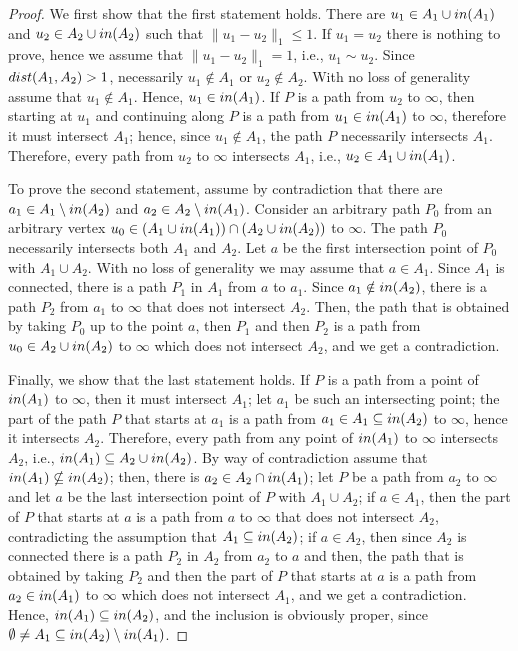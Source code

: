 \documentclass[11pt, reqno]{amsart}
\numberwithin{equation}{section}
\begin{document}
\begin{proof}
We first show that the first statement holds. 
There are $u_1\in A_1\cup{\rm in}(A_1)$ and $u_2\in A_2\cup{\rm in}(A_2)$ such that $\lVert u_1-u_2\rVert_1\leq 1$.
If $u_1=u_2$ there is nothing to prove, hence we assume that $\lVert u_1-u_2\rVert_1=1$, i.e., $u_1\sim u_2$.
Since ${\rm dist}(A_1,A_2)>1$, necessarily $u_1\notin A_1$ or $u_2\notin A_2$.
With no loss of generality assume that $u_1\notin A_1$.
Hence, $u_1\in{\rm in}(A_1)$.
If $P$ is a path from $u_2$ to $\infty$, then starting at $u_1$ and continuing along $P$ is a path from $u_1\in{\rm in}(A_1)$ to $\infty$, therefore it must intersect $A_1$; hence, since $u_1\notin A_1$, the path $P$ necessarily intersects $A_1$.
Therefore, every path from $u_2$ to $\infty$ intersects $A_1$, i.e., $u_2\in A_1\cup{\rm in}(A_1)$.

To prove the second statement, assume by contradiction that there are $a_1\in A_1\setminus{\rm in}(A_2)$ and $a_2\in A_2\setminus{\rm in}(A_1)$.
Consider an arbitrary path $P_0$ from an arbitrary vertex $u_0\in(A_1\cup{\rm in}(A_1))\cap(A_2\cup{\rm in}(A_2))$ to $\infty$. 
The path $P_0$ necessarily intersects both $A_1$ and $A_2$. Let $a$ be the first intersection point of $P_0$ with $A_1
\cup A_2$. With no loss of generality we may assume that $a\in A_1$. 
Since $A_1$ is connected, there is a path $P_1$ in $A_1$ from $a$ to $a_1$. Since $a_1\notin{\rm in}(A_2)$, there is a path $P_2$ from $a_1$ to $\infty$ that does not intersect $A_2$.
Then, the path that is obtained by taking $P_0$ up to the point $a$, then $P_1$ and then $P_2$ is a path from $u_0\in A_2\cup{\rm in}(A_2)$ to $\infty$ which does not intersect $A_2$, and we get a contradiction. 

Finally, we show that the last statement holds. 
If $P$ is a path from a point of ${\rm in}(A_1)$ to $\infty$, then it must intersect $A_1$; let $a_1$ be such an intersecting point; the part of the path $P$ that starts at $a_1$ is a path from $a_1\in A_1\subseteq{\rm in}(A_2)$ to $\infty$, hence it intersects $A_2$.
Therefore, every path from any point of ${\rm in}(A_1)$ to $\infty$ intersects $A_2$, i.e., ${\rm in}(A_1)\subseteq A_2\cup{\rm in}(A_2)$.
By way of contradiction assume that ${\rm in}(A_1)\nsubseteq {\rm in}(A_2)$; then, there is $a_2\in A_2\cap{\rm in}(A_1)$; let $P$ be a path from $a_2$ to $\infty$ and let $a$ be the last intersection point of $P$ with $A_1\cup A_2$; 
if $a\in A_1$, then the part of $P$ that starts at $a$ is a path from $a$ to $\infty$ that does not intersect $A_2$, contradicting the assumption that $A_1\subseteq{\rm in}(A_2)$;
if $a\in A_2$, then since $A_2$ is connected there is a path $P_2$ in $A_2$ from $a_2$ to $a$ and then, the path that is obtained by taking $P_2$ and then the part of $P$ that starts at $a$ is a path from $a_2\in{\rm in}(A_1)$ to $\infty$ which does not intersect $A_1$, and we get a contradiction.
Hence, ${\rm in}(A_1)\subseteq {\rm in}(A_2)$, and the inclusion is obviously proper, since $\emptyset\neq A_1\subseteq {\rm in}(A_2)\setminus{\rm in}(A_1)$.
\end{proof}
\end{document}
